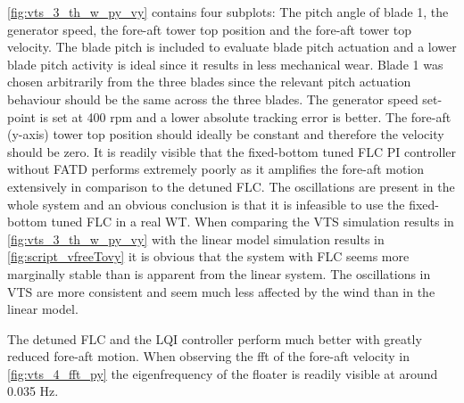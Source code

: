 \cref{fig:vts_3_th_w_py_vy} contains four subplots: The pitch angle of blade 1, the generator speed, the fore-aft tower top position and the fore-aft tower top velocity. The blade pitch is included to evaluate blade pitch actuation and a lower blade pitch activity is ideal since it results in less mechanical wear. Blade 1 was chosen arbitrarily from the three blades since the relevant pitch actuation behaviour should be the same across the three blades. The generator speed set-point is set at 400 rpm and a lower absolute tracking error is better. The fore-aft (y-axis) tower top position should ideally be constant and therefore the velocity should be zero. It is readily visible that the fixed-bottom tuned FLC PI controller without FATD performs extremely poorly as it amplifies the fore-aft motion extensively in comparison to the detuned FLC. The oscillations are present in the whole system and an obvious conclusion is that it is infeasible to use the fixed-bottom tuned FLC in a real WT. When comparing the VTS simulation results in \cref{fig:vts_3_th_w_py_vy} with the linear model simulation results in \cref{fig:script_vfreeTovy} it is obvious that the system with FLC seems more marginally stable than is apparent from the linear system. The oscillations in VTS are more consistent and seem much less affected by the wind than in the linear model.

The detuned FLC and the LQI controller perform much better with greatly reduced fore-aft motion. When observing the fft of the fore-aft velocity in \cref{fig:vts_4_fft_py} the eigenfrequency of the floater is readily visible at around 0.035 Hz.

